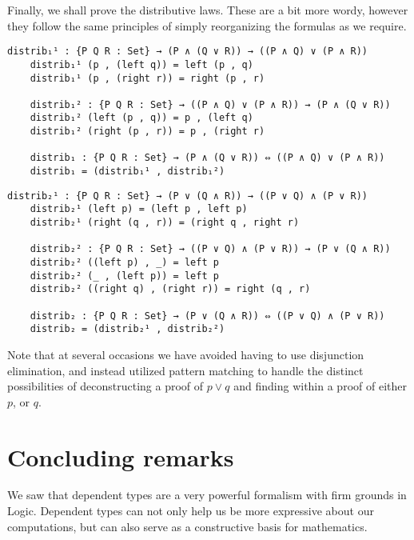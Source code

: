 \documentclass[12pt]{article}
\begin{document}
Finally, we shall prove the distributive laws. These are a bit more wordy, however they follow the same principles of simply reorganizing the formulas as we require.
\begin{Verbatim}[samepage=true]
    distrib₁¹ : {P Q R : Set} → (P ∧ (Q ∨ R)) → ((P ∧ Q) ∨ (P ∧ R))
    distrib₁¹ (p , (left q)) = left (p , q)
    distrib₁¹ (p , (right r)) = right (p , r)

    distrib₁² : {P Q R : Set} → ((P ∧ Q) ∨ (P ∧ R)) → (P ∧ (Q ∨ R))
    distrib₁² (left (p , q)) = p , (left q)
    distrib₁² (right (p , r)) = p , (right r)

    distrib₁ : {P Q R : Set} → (P ∧ (Q ∨ R)) ⇔ ((P ∧ Q) ∨ (P ∧ R))
    distrib₁ = (distrib₁¹ , distrib₁²)
\end{Verbatim}
\begin{Verbatim}[samepage=true]
    distrib₂¹ : {P Q R : Set} → (P ∨ (Q ∧ R)) → ((P ∨ Q) ∧ (P ∨ R))
    distrib₂¹ (left p) = (left p , left p)
    distrib₂¹ (right (q , r)) = (right q , right r)

    distrib₂² : {P Q R : Set} → ((P ∨ Q) ∧ (P ∨ R)) → (P ∨ (Q ∧ R))
    distrib₂² ((left p) , _) = left p
    distrib₂² (_ , (left p)) = left p
    distrib₂² ((right q) , (right r)) = right (q , r)

    distrib₂ : {P Q R : Set} → (P ∨ (Q ∧ R)) ⇔ ((P ∨ Q) ∧ (P ∨ R))
    distrib₂ = (distrib₂¹ , distrib₂²)
\end{Verbatim}
Note that at several occasions we have avoided having to use disjunction elimination, and instead utilized pattern matching to handle the distinct possibilities of deconstructing a proof of $p ∨ q$ and finding within a proof of either $p$, or $q$.

\section{Concluding remarks}
We saw that dependent types are a very powerful formalism with firm grounds in Logic. Dependent types can not only help us be more expressive about our computations, but can also serve as a constructive basis for mathematics.

\newpage
\printbibliography{}
\end{document}
